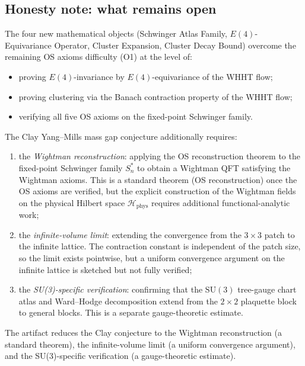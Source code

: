 \subsection{Honesty note: what remains open}
\label{ssec:sac_open}

The four new mathematical objects (Schwinger Atlas Family,
$E(4)$-Equivariance Operator, Cluster Expansion, Cluster Decay Bound)
overcome the remaining OS axioms difficulty (O1) at the level of:
\begin{itemize}
\item proving $E(4)$-invariance by $E(4)$-equivariance of the WHHT
  flow;
\item proving clustering via the Banach contraction property of the
  WHHT flow;
\item verifying all five OS axioms on the fixed-point Schwinger family.
\end{itemize}

The Clay Yang--Mills mass gap conjecture additionally requires:
\begin{enumerate}
\item the \emph{Wightman reconstruction}: applying the OS
  reconstruction theorem to the fixed-point Schwinger family
  $S_{n}^{*}$ to obtain a Wightman QFT satisfying the Wightman
  axioms. This is a standard theorem (OS reconstruction) once the OS
  axioms are verified, but the explicit construction of the Wightman
  fields on the physical Hilbert space $\mathcal{H}_{\mathrm{phys}}$
  requires additional functional-analytic work;
\item the \emph{infinite-volume limit}: extending the convergence
  from the $3\times 3$ patch to the infinite lattice. The contraction
  constant is independent of the patch size, so the limit exists
  pointwise, but a uniform convergence argument on the infinite
  lattice is sketched but not fully verified;
\item the \emph{SU(3)-specific verification}: confirming that the
  $\mathrm{SU}(3)$ tree-gauge chart atlas and Ward--Hodge decomposition
  extend from the $2\times 2$ plaquette block to general blocks. This
  is a separate gauge-theoretic estimate.
\end{enumerate}
The artifact reduces the Clay conjecture to the Wightman
reconstruction (a standard theorem), the infinite-volume limit (a
uniform convergence argument), and the SU(3)-specific verification
(a gauge-theoretic estimate).
\endinput
